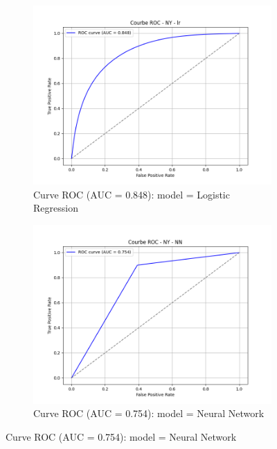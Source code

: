 \begin{figure}[h]
    \centering
    \begin{subfigure}[b]{0.48\textwidth}
        \includegraphics[width=\textwidth]{Images/curve_roc_folktables/roc_curve_NY_lr.png}
        \caption{Curve ROC (AUC = 0.848): model = Logistic Regression}
        \label{fig:NY_lr}
    \end{subfigure}
    \hfill
    \begin{subfigure}[b]{0.48\textwidth}
        \includegraphics[width=\textwidth]{Images/curve_roc_folktables/roc_curve_NY_NN.png}
        \caption{Curve ROC (AUC = 0.754): model = Neural Network}
        \label{fig:NY_nn}
    \end{subfigure}


\end{figure}
